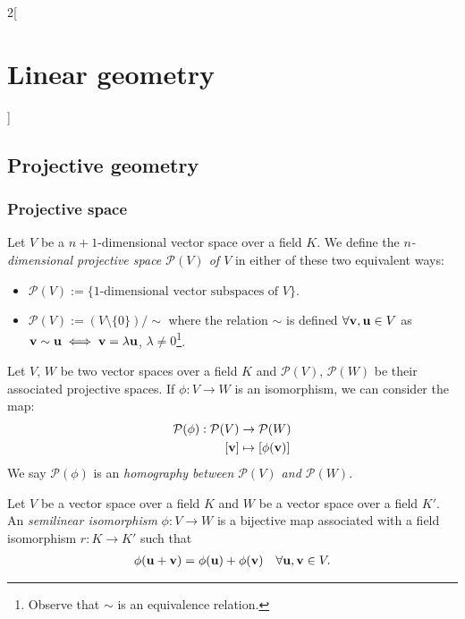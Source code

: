 \documentclass[../../../main.tex]{subfiles}
\begin{document}
\begin{multicols}{2}[\section{Linear geometry}]
    \subsection{Projective geometry}
    \subsubsection*{Projective space}
    \begin{definition}
        Let $V$ be a $n+1$-dimensional vector space over a field $K$. We define the \textit{$n$-dimensional projective space $\mathcal{P}(V)$ of $V$} in either of these two equivalent ways:
        \begin{itemize}
            \item $\displaystyle\mathcal{P}(V):=\{\text{1-dimensional vector subspaces of $V$}\}$.
            \item $\displaystyle\mathcal{P}(V):=(V\setminus\{0\})/\sim$ where the relation $\sim$ is defined $\forall\boldsymbol{\mathrm{v}},\boldsymbol{\mathrm{u}}\in V$ as $\boldsymbol{\mathrm{v}}\sim \boldsymbol{\mathrm{u}}\iff \boldsymbol{\mathrm{v}}=\lambda \boldsymbol{\mathrm{u}}$, $\lambda\ne 0$\footnote{Observe that $\sim$ is an equivalence relation.}.
        \end{itemize}
    \end{definition}
    \begin{definition}
        Let $V$, $W$ be two vector spaces over a field $K$ and $\mathcal{P}(V)$, $\mathcal{P}(W)$ be their associated projective spaces. If $\phi:V\rightarrow W$ is an isomorphism, we can consider the map:
        \begin{align*}
            \mathcal{P}(\phi):\mathcal{P}(V) & \rightarrow\mathcal{P}(W)          \\
            [\vectorfunction{v}]             & \mapsto [\phi(\vectorfunction{v})]
        \end{align*}
        We say $\mathcal{P}(\phi)$ is an \textit{homography between $\mathcal{P}(V)$ and $\mathcal{P}(W)$}.
    \end{definition}
    \begin{definition}
        Let $V$ be a vector space over a field $K$ and $W$ be a vector space over a field $K'$. An \textit{semilinear isomorphism} $\phi:V\rightarrow W$ is a bijective map associated with a field isomorphism $r:K\rightarrow K'$ such that
        \begin{gather*}
            \phi(\vectorfunction{u}+\vectorfunction{v})=\phi(\vectorfunction{u})+\phi(\vectorfunction{v})\quad \forall \vectorfunction{u},\vectorfunction{v}\in V.\\

\end{gather*}
\end{definition}
\end{multicols}
\end{document}
